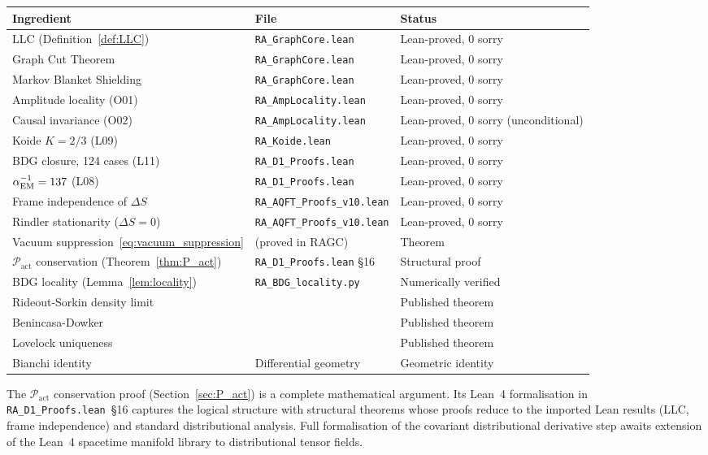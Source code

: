 \documentclass[11pt,a4paper]{article}
\newcommand{\Pact}{\mathcal{P}_{\mathrm{act}}}
\newcommand{\dS}{\Delta S}
\begin{document}
\begin{center}
\renewcommand{\arraystretch}{1.25}
\begin{tabular}{lll}
\toprule
Ingredient & File & Status \\
\midrule
LLC (Definition~\ref{def:LLC}) & \texttt{RA\_GraphCore.lean} & Lean-proved, 0 sorry \\
Graph Cut Theorem & \texttt{RA\_GraphCore.lean} & Lean-proved, 0 sorry \\
Markov Blanket Shielding & \texttt{RA\_GraphCore.lean} & Lean-proved, 0 sorry \\
Amplitude locality (O01) & \texttt{RA\_AmpLocality.lean} & Lean-proved, 0 sorry \\
Causal invariance (O02) & \texttt{RA\_AmpLocality.lean} & Lean-proved, 0 sorry (unconditional) \\
Koide $K=2/3$ (L09) & \texttt{RA\_Koide.lean} & Lean-proved, 0 sorry \\
BDG closure, 124 cases (L11) & \texttt{RA\_D1\_Proofs.lean} & Lean-proved, 0 sorry \\
$\alpha_{\rm EM}^{-1}=137$ (L08) & \texttt{RA\_D1\_Proofs.lean} & Lean-proved, 0 sorry \\
Frame independence of $\dS$ & \texttt{RA\_AQFT\_Proofs\_v10.lean} & Lean-proved, 0 sorry \\
Rindler stationarity ($\Delta S=0$) & \texttt{RA\_AQFT\_Proofs\_v10.lean} & Lean-proved, 0 sorry \\
Vacuum suppression~\eqref{eq:vacuum_suppression} & (proved in RAGC) & Theorem \\
$\Pact$ conservation (Theorem~\ref{thm:P_act}) & \texttt{RA\_D1\_Proofs.lean} §16 & Structural proof \\
BDG locality (Lemma~\ref{lem:locality}) & \texttt{RA\_BDG\_locality.py} & Numerically verified \\
Rideout-Sorkin density limit & \citep{RideoutSorkin2000} & Published theorem \\
Benincasa-Dowker & \citep{Benincasa2010} & Published theorem \\
Lovelock uniqueness & \citep{Lovelock1971} & Published theorem \\
Bianchi identity & Differential geometry & Geometric identity \\
\bottomrule
\end{tabular}
\end{center}

\noindent
The $\Pact$ conservation proof (Section~\ref{sec:P_act}) is a
complete mathematical argument. Its Lean~4 formalisation in
\texttt{RA\_D1\_Proofs.lean}~§16 captures the logical structure with
structural theorems whose proofs reduce to the imported Lean results
(LLC, frame independence) and standard distributional analysis. Full
formalisation of the covariant distributional derivative step awaits
extension of the Lean~4 spacetime manifold library to distributional
tensor fields.
\end{document}
